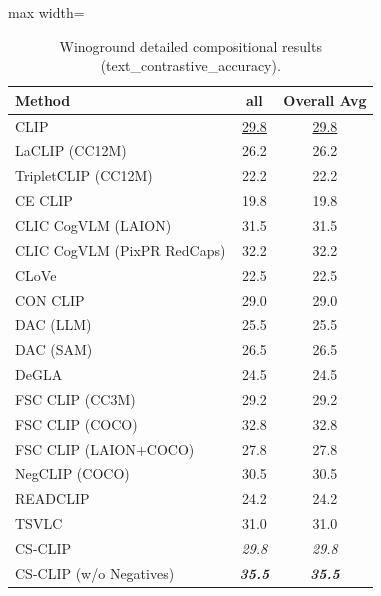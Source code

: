 \begin{table}[t]
  \centering
  \scriptsize
  \caption{Winoground detailed compositional results (text_contrastive_accuracy).}
  \label{tab:Winoground_detailed}
  \begin{adjustbox}{max width=\textwidth}
  \setlength{\tabcolsep}{2pt}
  \begin{tabular}{p{5cm}c|c}
    \toprule
    Method & all & Overall Avg \\
    \midrule
    CLIP & \underline{29.8} & \underline{29.8} \\
    \midrule
    LaCLIP (CC12M) & 26.2 & 26.2 \\
    TripletCLIP (CC12M) & 22.2 & 22.2 \\
    \midrule
    CE CLIP & 19.8 & 19.8 \\
    CLIC CogVLM (LAION) & 31.5 & 31.5 \\
    CLIC CogVLM (PixPR RedCaps) & 32.2 & 32.2 \\
    CLoVe & 22.5 & 22.5 \\
    CON CLIP & 29.0 & 29.0 \\
    DAC (LLM) & 25.5 & 25.5 \\
    DAC (SAM) & 26.5 & 26.5 \\
    DeGLA & 24.5 & 24.5 \\
    FSC CLIP (CC3M) & 29.2 & 29.2 \\
    FSC CLIP (COCO) & 32.8 & 32.8 \\
    FSC CLIP (LAION+COCO) & 27.8 & 27.8 \\
    NegCLIP (COCO) & 30.5 & 30.5 \\
    READCLIP & 24.2 & 24.2 \\
    TSVLC & 31.0 & 31.0 \\
    \midrule
    CS-CLIP & \emph{29.8} & \emph{29.8} \\
    CS-CLIP (w/o Negatives) & \emph{\textbf{35.5}} & \emph{\textbf{35.5}} \\
    \bottomrule
  \end{tabular}
  \end{adjustbox}
\end{table}